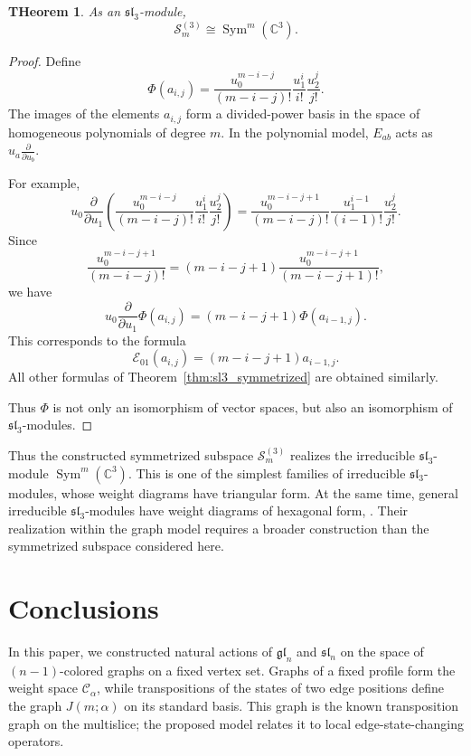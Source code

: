 \documentclass[12pt,reqno]{amsart}
\newtheorem{theorem}{THeorem}[section]
\newcommand{\Sym}{\operatorname{Sym}}
\begin{document}
\begin{theorem}
As an $\mathfrak{sl}_3$-module,
$$
\mathcal S_m^{(3)}\cong\Sym^m(\mathbb C^3).
$$
\end{theorem}

\begin{proof}
Define
$$
\Phi(a_{i,j})
=
\frac{u_0^{m-i-j}}{(m-i-j)!}
\frac{u_1^i}{i!}
\frac{u_2^j}{j!}.
$$
The images of the elements $a_{i,j}$ form a divided-power basis in the
space of homogeneous polynomials of degree $m$. In the polynomial model,
$E_{ab}$ acts as $u_a\frac{\partial}{\partial u_b}$.

For example,
$$
u_0\frac{\partial}{\partial u_1}
\left(
\frac{u_0^{m-i-j}}{(m-i-j)!}
\frac{u_1^i}{i!}
\frac{u_2^j}{j!}
\right)
=
\frac{u_0^{m-i-j+1}}{(m-i-j)!}
\frac{u_1^{i-1}}{(i-1)!}
\frac{u_2^j}{j!}.
$$
Since
$$
\frac{u_0^{m-i-j+1}}{(m-i-j)!}
=
(m-i-j+1)
\frac{u_0^{m-i-j+1}}{(m-i-j+1)!},
$$
we have
$$
u_0\frac{\partial}{\partial u_1}\Phi(a_{i,j})
=
(m-i-j+1)\Phi(a_{i-1,j}).
$$
This corresponds to the formula
$$
\mathcal E_{01}(a_{i,j})
=
(m-i-j+1)a_{i-1,j}.
$$
All other formulas of Theorem~\ref{thm:sl3_symmetrized} are obtained
similarly.

Thus $\Phi$ is not only an isomorphism of vector spaces, but also an
isomorphism of $\mathfrak{sl}_3$-modules.
\end{proof}

Thus the constructed symmetrized subspace $\mathcal S_m^{(3)}$ realizes
the irreducible $\mathfrak{sl}_3$-module
$
\Sym^m(\mathbb C^3).
$
This is one of the simplest families of irreducible
$\mathfrak{sl}_3$-modules, whose weight diagrams have triangular form.
At the same time, general irreducible $\mathfrak{sl}_3$-modules have
weight diagrams of hexagonal form, \cite{FultonHarris}. Their realization
within the graph model requires a broader construction than the
symmetrized subspace considered here.


\section{Conclusions}


In this paper, we constructed natural actions of $\mathfrak{gl}_n$ and
$\mathfrak{sl}_n$ on the space of $(n-1)$-colored graphs on a fixed
vertex set. Graphs of a fixed profile form the weight space
$\mathcal C_\alpha$, while transpositions of the states of two edge
positions define the graph $J(m;\alpha)$ on its standard basis. This graph
is the known transposition graph on the multislice; the proposed model
relates it to local edge-state-changing operators.
\end{document}

